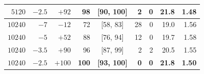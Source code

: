 \begin{table}[t]
\begin{tabular}{rrrrcrrrr}
$5120$ & $-2.5$ & $+92$ & 98 & [90, 100] & 2 & 0 & 21.8 & 1.48 \\
\midrule
$10240$ & $-7$ & $-12$ & 72 & [58, 83] & 28 & 0 & 19.0 & 1.56 \\
$10240$ & $-5$ & $+52$ & 88 & [76, 94] & 12 & 0 & 19.7 & 1.58 \\
$10240$ & $-3.5$ & $+90$ & 96 & [87, 99] & 2 & 2 & 20.5 & 1.55 \\
{\boldmath\bfseries $10240$} & {\boldmath\bfseries $-2.5$} & {\boldmath\bfseries $+100$} & {\boldmath\bfseries 100} & {\boldmath\bfseries [93, 100]} & {\boldmath\bfseries 0} & {\boldmath\bfseries 0} & {\boldmath\bfseries 21.8} & {\boldmath\bfseries 1.50} \\
\bottomrule
\end{tabular}
\end{table}
